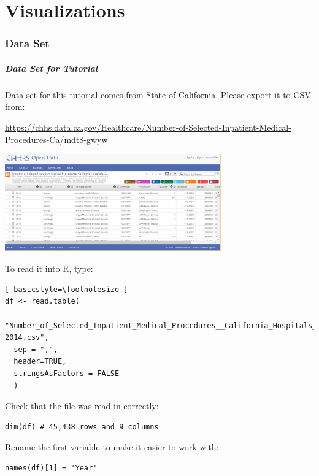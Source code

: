 \part{Visualizations}

\section{Data Set}
\begin{frame}
\frametitle{Data Set for Tutorial}
	Data set for this tutorial comes from State of California.  Please export it to CSV from: \\
	\vspace{5pt}

	\noindent \url{https://chhs.data.ca.gov/Healthcare/Number-of-Selected-Inpatient-Medical-Procedures-Ca/mdt8-gwyw}

    \begin{center}
     \includegraphics[width=0.7\textwidth]{images/data.png}
    \end{center}  

\newpage   
	\noindent To read it into R, type:
  		\begin{lstlisting}[ basicstyle=\footnotesize ]
df <- read.table(
  "Number_of_Selected_Inpatient_Medical_Procedures__California_Hospitals__2005-2014.csv",
  sep = ",",
  header=TRUE,
  stringsAsFactors = FALSE
  )
    \end{lstlisting}

Check that the file was read-in correctly:
\begin{lstlisting}
dim(df) # 45,438 rows and 9 columns
\end{lstlisting}

Rename the first variable to make it easier to work with:
\begin{lstlisting}
names(df)[1] = 'Year'
		\end{lstlisting}

\end{frame}


